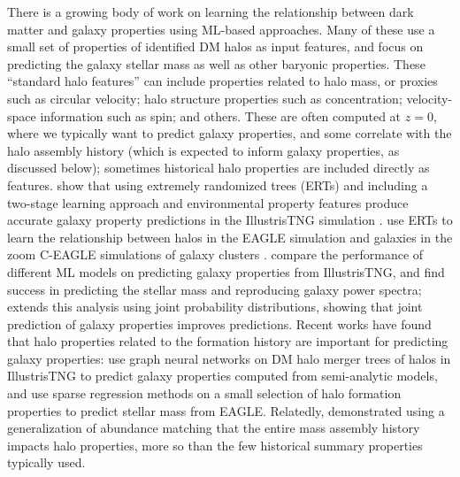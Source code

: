 There is a growing body of work on learning the relationship between dark matter and galaxy properties using ML-based approaches.
Many of these use a small set of properties of identified DM halos as input features, and focus on predicting the galaxy stellar mass as well as other baryonic properties.
These ``standard halo features'' can include properties related to halo mass, or proxies such as circular velocity; halo structure properties such as concentration; velocity-space information such as spin; and others.
These are often computed at $z=0$, where we typically want to predict galaxy properties, and some correlate with the halo assembly history (which is expected to inform galaxy properties, as discussed below); sometimes historical halo properties are included directly as features.
\cite{jo_machine-assisted_2019} show that using extremely randomized trees (ERTs) and including a two-stage learning approach and environmental property features produce accurate galaxy property predictions in the IllustrisTNG simulation \citep{springel_first_2018,nelson_first_2018,pillepich_first_2018,naiman_first_2018,marinacci_first_2018}.
\cite{lovell_machine_2021} use ERTs to learn the relationship between halos in the EAGLE simulation and galaxies in the zoom C-EAGLE simulations of galaxy clusters \citep{crain_eagle_2015}.
\cite{de_santi_mimicking_2021} compare the performance of different ML models on predicting galaxy properties from IllustrisTNG, and find success in predicting the stellar mass and reproducing galaxy power spectra; \cite{rodrigues_high-fidelity_2023} extends this analysis using joint probability distributions, showing that joint prediction of galaxy properties improves predictions.
Recent works have found that halo properties related to the formation history are important for predicting galaxy properties: \cite{jespersen_learning_2022} use graph neural networks on DM halo merger trees of halos in IllustrisTNG to predict galaxy properties computed from semi-analytic models, and \cite{icaza-lizaola_sparse_2022} use sparse regression methods on a small selection of halo formation properties to predict stellar mass from EAGLE.
Relatedly, \cite{mendoza_multicam_2023} demonstrated using a generalization of abundance matching that the entire mass assembly history impacts halo properties, more so than the few historical summary properties typically used.

